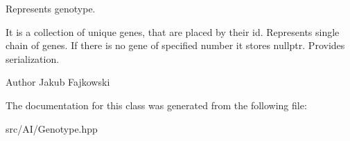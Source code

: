 Represents genotype. 

It is a collection of unique genes, that are placed by their id. Represents single chain of genes. If there is no gene of specified number it stores nullptr. Provides serialization. \begin{DoxyAuthor}{Author}
Jakub Fajkowski 
\end{DoxyAuthor}


The documentation for this class was generated from the following file\+:\begin{DoxyCompactItemize}
\item 
src/\+A\+I/Genotype.\+hpp\end{DoxyCompactItemize}
